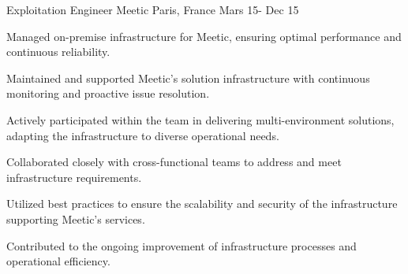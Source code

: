 \begin{cventries}
\cventry
{Exploitation Engineer} %
{Meetic} %
{Paris, France} %
{Mars 15- Dec 15} %
{
  \begin{cvitems} %
    \item {Managed on-premise infrastructure for Meetic, ensuring optimal performance and continuous reliability.}
    \item {Maintained and supported Meetic's solution infrastructure with continuous monitoring and proactive issue resolution.}
    \item {Actively participated within the team in delivering multi-environment solutions, adapting the infrastructure to diverse operational needs.}
    \item {Collaborated closely with cross-functional teams to address and meet infrastructure requirements.}
    \item {Utilized best practices to ensure the scalability and security of the infrastructure supporting Meetic's services.}
    \item {Contributed to the ongoing improvement of infrastructure processes and operational efficiency.}
  \end{cvitems}
}


\end{cventries}
